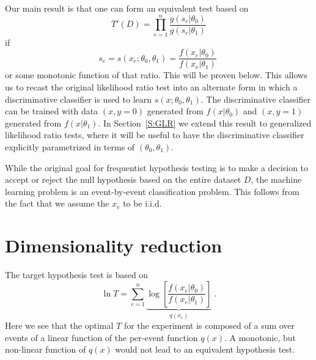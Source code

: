 \documentclass[11pt, oneside]{article}   	%
\begin{document}
Our main result is that one can form an equivalent test based on 
\begin{equation}\label{eq:equivLRtest}
T'(D) = \prod_{e=1}^n \frac{ g(s_e | \theta_0)}{ g(s_e | \theta_1)}
\end{equation}
if 
\begin{equation}
s_e = s(x_e; \theta_0, \theta_1) = \frac{ f(x_e|\theta_0)}{ f(x_e|\theta_1)} \; 
\end{equation}
or some monotonic function of that ratio. This will be proven below.
This allows us to recast the original likelihood ratio test into an alternate form in which a discriminative classifier is 
used to learn $s(x; \theta_0, \theta_1)$. The discriminative classifier can be trained with data $(x,y=0)$ generated 
from $f(x|\theta_0)$ and $(x,y=1)$ generated from $f(x|\theta_1)$. In Section~\ref{S:GLR} we extend this result to generalized likelihood ratio tests, where it will be useful to have the discriminative classifier explicitly parametrized in terms of $(\theta_0, \theta_1)$.

While the original goal for frequentist hypothesis testing is to make a decision to accept or reject the null hypothesis based on the entire dataset $D$, the machine learning problem is an event-by-event classification problem. This follows from the fact that we assume the $x_e$ to be i.i.d.

\section{Dimensionality reduction}


 The target hypothesis test is based on 
\begin{equation}
\ln T =   \sum_{e=1}^n \underbrace{\log \left[ \frac {f(x_e | \theta_0) }{ f(x_e | \theta_1) } \right]}_{q(x_e)} \;.
\end{equation}
Here we see that the optimal $T$ for the experiment is composed of a sum over events of a  linear function of the per-event function $q(x)$. A monotonic, but non-linear function of $q(x)$ would not lead to an equivalent hypothesis test. 
\end{document}
